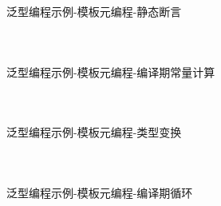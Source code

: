 \documentclass[UTF8,aspectratio=169]{beamer}
\begin{document}
\begin{frame}[fragile]{泛型编程示例-模板元编程-静态断言}
    \begin{columns}
        \begin{column}{0.48\textwidth}
            \inputminted[firstline=1,lastline=19]{cpp}{code/gp_template_metaprogramming_2.cpp}
        \end{column}
        \begin{column}{0.48\textwidth}
            \inputminted[firstline=21,lastline=38]{cpp}{code/gp_template_metaprogramming_2.cpp}
        \end{column}
    \end{columns}
\end{frame}

\begin{frame}[fragile]{泛型编程示例-模板元编程-编译期常量计算}
    \begin{columns}
        \begin{column}{0.48\textwidth}
            \inputminted[firstline=1,lastline=16]{cpp}{code/gp_template_metaprogramming_3.cpp}
        \end{column}
        \begin{column}{0.48\textwidth}
            \inputminted[firstline=18,lastline=34]{cpp}{code/gp_template_metaprogramming_3.cpp}
        \end{column}
    \end{columns}
\end{frame}

\begin{frame}[fragile]{泛型编程示例-模板元编程-类型变换}
    \begin{columns}
        \begin{column}{0.48\textwidth}
            \inputminted[firstline=1,lastline=12]{cpp}{code/gp_template_metaprogramming_4.cpp}
        \end{column}
        \begin{column}{0.48\textwidth}
            \inputminted[firstline=13,lastline=24]{cpp}{code/gp_template_metaprogramming_4.cpp}
        \end{column}
    \end{columns}
\end{frame}

\begin{frame}[fragile]{泛型编程示例-模板元编程-编译期循环}
    \begin{columns}
        \begin{column}{0.48\textwidth}
            \inputminted[firstline=1,lastline=17]{cpp}{code/gp_template_metaprogramming_5.cpp}
        \end{column}
        \begin{column}{0.48\textwidth}
            \inputminted[firstline=19,lastline=35]{cpp}{code/gp_template_metaprogramming_5.cpp}
        \end{column}
    \end{columns}
\end{frame}
\end{document}
